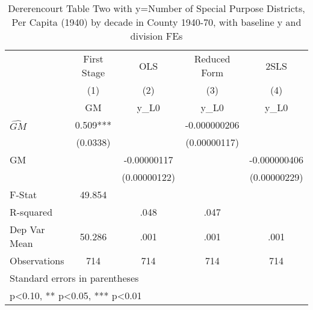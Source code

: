 \begin{table}[htbp]\centering
\def\sym#1{\ifmmode^{#1}\else\(^{#1}\)\fi}
\caption{Dererencourt Table Two with y=Number of Special Purpose Districts, Per Capita (1940) by decade in County 1940-70, with baseline y and division FEs}
\begin{tabular}{l*{4}{c}}
\toprule
                    & First Stage   &         OLS   &Reduced Form   &        2SLS   \\
                    &\multicolumn{1}{c}{(1)}&\multicolumn{1}{c}{(2)}&\multicolumn{1}{c}{(3)}&\multicolumn{1}{c}{(4)}\\
                    &\multicolumn{1}{c}{GM}&\multicolumn{1}{c}{y\_L0}&\multicolumn{1}{c}{y\_L0}&\multicolumn{1}{c}{y\_L0}\\
\midrule
$\hat{GM}$          &       0.509***&               &-0.000000206   &               \\
                    &    (0.0338)   &               &(0.00000117)   &               \\
\addlinespace
GM                  &               & -0.00000117   &               &-0.000000406   \\
                    &               &(0.00000122)   &               &(0.00000229)   \\
\midrule
F-Stat              &      49.854   &               &               &               \\
R-squared           &               &        .048   &        .047   &               \\
Dep Var Mean        &      50.286   &        .001   &        .001   &        .001   \\
Observations        &         714   &         714   &         714   &         714   \\
\bottomrule
\multicolumn{5}{l}{\footnotesize Standard errors in parentheses}\\
\multicolumn{5}{l}{\footnotesize * p<0.10, ** p<0.05, *** p<0.01}\\
\end{tabular}
\end{table}
